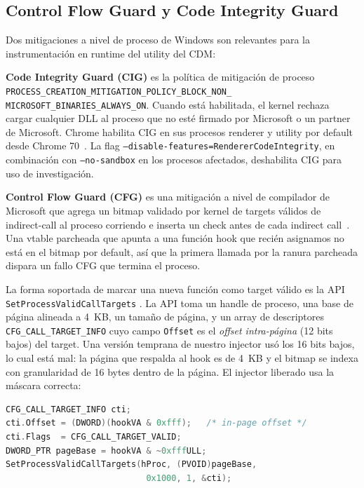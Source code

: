 \documentclass[11pt,letterpaper]{article}
\begin{document}
\subsection{Control Flow Guard y Code Integrity Guard}
\label{sec:bg-cfg-cig}

Dos mitigaciones a nivel de proceso de Windows son relevantes
para la instrumentación en runtime del utility del CDM:

\textbf{Code Integrity Guard (CIG)} es la política de mitigación
de proceso \texttt{PROCESS\_CREATION\_MITIGATION\_POLICY\_BLOCK\_NON\_\\MICROSOFT\_BINARIES\_ALWAYS\_ON}.
Cuando está habilitada, el kernel rechaza cargar cualquier DLL al
proceso que no esté firmado por Microsoft o un partner de
Microsoft. Chrome habilita CIG en sus procesos renderer y utility
por default desde Chrome 70~\cite{chromium-cig}. La flag
\texttt{--disable-features=RendererCodeIntegrity}, en combinación
con \texttt{--no-sandbox} en los procesos afectados, deshabilita
CIG para uso de investigación.

\textbf{Control Flow Guard (CFG)} es una mitigación a nivel de
compilador de Microsoft que agrega un bitmap validado por kernel
de targets válidos de indirect-call al proceso corriendo e
inserta un check antes de cada indirect call~\cite{microsoft-cfg}.
Una vtable parcheada que apunta a una función hook que recién
asignamos no está en el bitmap por default, así que la primera
llamada por la ranura parcheada dispara un fallo CFG que termina
el proceso.

La forma soportada de marcar una nueva función como target válido
es la API \texttt{SetProcessValidCallTargets}
\cite{ms-spvct-docs}. La API toma un handle de proceso, una base
de página alineada a 4~KB, un tamaño de página, y un array de
descriptores \texttt{CFG\_CALL\_TARGET\_INFO} cuyo campo
\texttt{Offset} es el \emph{offset intra-página} (12 bits bajos)
del target. Una versión temprana de nuestro injector usó los 16
bits bajos, lo cual está mal: la página que respalda al hook es
de 4~KB y el bitmap se indexa con granularidad de 16 bytes
dentro de la página. El injector liberado usa la máscara
correcta:

\begin{lstlisting}[language=C, basicstyle=\ttfamily\scriptsize]
CFG_CALL_TARGET_INFO cti;
cti.Offset = (DWORD)(hookVA & 0xfff);   /* in-page offset */
cti.Flags  = CFG_CALL_TARGET_VALID;
DWORD_PTR pageBase = hookVA & ~0xfffULL;
SetProcessValidCallTargets(hProc, (PVOID)pageBase,
                            0x1000, 1, &cti);
\end{lstlisting}
\end{document}
